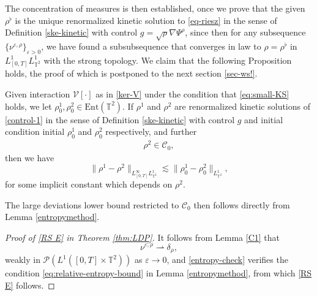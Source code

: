 The concentration of measures is then established, once we prove that the given $\rho^{\flat}$ is the unique renormalized kinetic solution to \eqref{eq-riesz} in the sense of Definition \ref{ske-kinetic} with control $g = \sqrt{\rho} \nabla \Psi^{\rho}$, since then for any subsequence $\{\nu^{\varepsilon, \rho}\}_{\varepsilon > 0}$, we have found a subsubsequence that converges in law to $\rho = \rho^{\flat}$ in $L^1_{[0,T]}L^1_{\mathbb{T}^2}$ with the strong topology. We claim that the following Proposition holds, the proof of which is postponed to the next section \ref{sec-ws!}. 
\begin{prop}\label{L1uniq}
Given interaction $\mathcal{V}[\cdot]$ as in \eqref{ker-V} under the condition that \eqref{eq:small-KS} holds, we let $\rho^1_0,\rho^2_0 \in \mathrm{Ent}(\mathbb{T}^2)$. If $\rho^1$ and $\rho^2$ are renormalized kinetic solutions of  \eqref{control-1} in the sense of Definition \ref{ske-kinetic} with control $g$ and initial condition initial  $\rho^1_0$ and $\rho^2_0$ respectively, and further 
\begin{align}\label{eq:strong-rho2}
\rho^2 \in \mathcal{C}_0,
\end{align}
then we have
\begin{equation}\label{qq-31-1}
\|\rho^1-\rho^2\|_{L^{\infty}_{[0,T]}L^1_{\mathbb{T}^2}}\lesssim \|\rho_0^1-\rho_0^2\|_{L^1_{\mathbb{T}^2}}, 
\end{equation}
for some implicit constant which depends on $\rho^2$.
\end{prop} 

The large deviations lower bound restricted to $\mathcal{C}_0$ then follows directly from Lemma \ref{entropymethod}.
\begin{proof}[Proof of \eqref{RS E} in Theorem \ref{thm:LDP}]
It follows from Lemma \ref{C1} that 
\begin{equation}\label{RL MC}
\nu^{\varepsilon;\rho}\rightharpoonup\delta_{\rho},
\end{equation}
weakly in $\mathcal{P}(L^1([0,T] \times \mathbb{T}^2))$ as $\varepsilon\rightarrow0$, and \eqref{entropy-check} verifies the condition \eqref{eq:relative-entropy-bound} in Lemma \ref{entropymethod}, from which \eqref{RS E} follows.
\end{proof}

